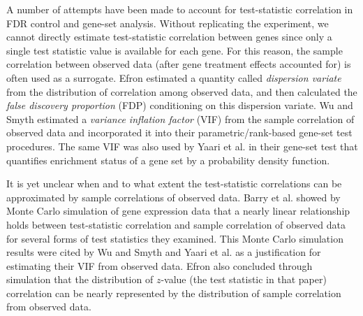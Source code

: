 \documentclass[review]{elsarticle}
\begin{document}
	A number of attempts have been made to account for test-statistic
	correlation in FDR control and gene-set analysis. 
	Without replicating the experiment, we cannot directly estimate test-statistic
	correlation between genes since only a single test statistic value is 
	available for each gene. For this reason, the sample correlation
	between observed data (after gene 
	treatment effects accounted for) is often used as a surrogate.
	Efron \cite{efron2007correlation} estimated a quantity called \textit{dispersion variate} from the 
	distribution 
	of correlation among observed data, and then calculated the \textit{false discovery proportion} 
	(FDP) conditioning on this dispersion variate. Wu and Smyth \cite{wu2012camera} estimated a \textit{variance 
		inflation factor} (VIF) from the sample correlation of observed data and 
	incorporated it into their parametric/rank-based gene-set test procedures. The same VIF was also 
	used by Yaari et al. \cite{yaari2013quantitative} in their gene-set test that quantifies enrichment status of a 
	gene set by a probability density function. 
	
	It is yet unclear when and to what extent the test-statistic correlations can be approximated 
	by sample correlations of observed data. Barry et al. \cite{barry2008statistical} showed by Monte Carlo 
	simulation of gene expression data that a nearly linear relationship holds between test-statistic 
	correlation and sample correlation of observed data for
	several forms of test statistics they examined. This Monte Carlo
	simulation results were cited by Wu and Smyth \cite{wu2012camera} and
	Yaari et al. \cite{yaari2013quantitative} as a justification for estimating their
	VIF from observed data. Efron \cite{efron2007correlation} also concluded
	through simulation that the distribution of $z$-value (the test
	statistic in that paper) correlation can be nearly represented by the
	distribution of sample correlation from observed data. 	
	
\end{document}
